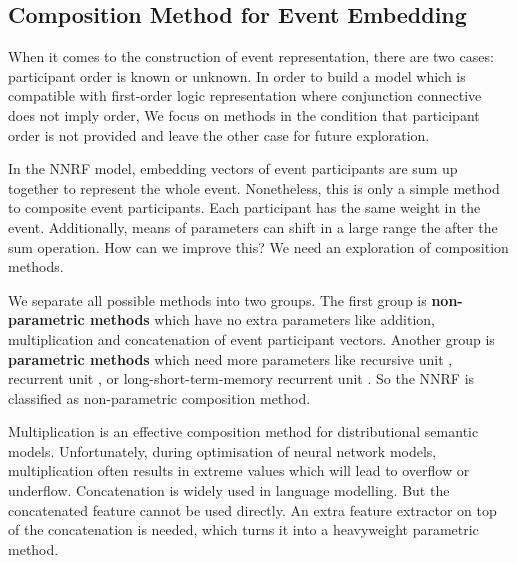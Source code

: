 \documentclass[a4paper]{article}
\begin{document}
\subsection{Composition Method for Event Embedding} \label{sec:composition}
When it comes to the construction of event representation, there are two cases: participant order is known or unknown. In order to build a model which is compatible with first-order logic representation where conjunction connective does not imply order, 
We focus on methods in the condition that participant order is not provided and leave the other case for future exploration.

In the NNRF model, embedding vectors of event participants are sum up together to represent the whole event. Nonetheless, this is only a simple method to composite event participants. Each participant has the same weight in the event. Additionally, means of parameters can shift in a large range the after the sum operation. How can we improve this? We need an exploration of composition methods. 

We separate all possible methods into two groups. The first group is \textbf{non-parametric methods} which have no extra parameters like addition, multiplication and concatenation of event participant vectors. Another group is \textbf{parametric methods} which need more parameters like recursive unit \citep{socher2013recursive}, recurrent unit \citet{mikolov2010recurrent}, or long-short-term-memory recurrent unit \citep{hochreiter1997LSTM}. So the NNRF is classified as non-parametric composition method. 

Multiplication is an effective composition method for distributional semantic models. Unfortunately, during optimisation of neural network models, multiplication often results in extreme values which will lead to overflow or underflow. Concatenation is widely used in language modelling. But the concatenated feature cannot be used directly. An extra feature extractor on top of the concatenation is needed, which turns it into a heavyweight parametric method. 
% 
% 
% 
%
% 
%
% 
%
% 
%
\end{document}
